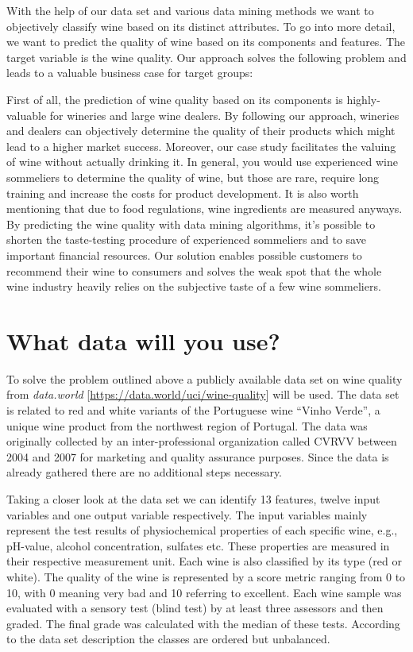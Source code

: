 \documentclass[11pt,titlepage,oneside,openany]{article}
\begin{document}
With the help of our data set and various data mining methods we want to objectively classify wine based on its distinct attributes. To go into more detail, we want to predict the quality of wine based on its components and features. The target variable is the wine quality. Our approach solves the following problem and leads to a valuable business case for target groups:

First of all, the prediction of wine quality based on its components is highly-valuable for wineries and large wine dealers. By following our approach, wineries and dealers can objectively determine the quality of their products which might lead to a higher market success. Moreover, our case study facilitates the valuing of wine without actually drinking it. In general, you would use experienced wine sommeliers to determine the quality of wine, but those are rare, require long training and increase the costs for product development. It is also worth mentioning that due to food regulations, wine ingredients are measured anyways. By predicting the wine quality with data mining algorithms, it’s possible to shorten the taste-testing procedure of experienced sommeliers and to save important financial resources. Our solution enables possible customers to recommend their wine to consumers and solves the weak spot that the whole wine industry heavily relies on the subjective taste of a few wine sommeliers.

\section{What data will you use?}
To solve the problem outlined above a publicly available data set on wine quality from \textit{data.world} [\url{https://data.world/uci/wine-quality}] will be used. The data set is related to red and white variants of the Portuguese wine “Vinho Verde”, a unique wine product from the northwest region of Portugal. The data was originally collected by an inter-professional organization called CVRVV between 2004 and 2007 for marketing and quality assurance purposes. Since the data is already gathered there are no additional steps necessary. 

Taking a closer look at the data set we can identify 13 features, twelve input variables and one output variable respectively. The input variables mainly represent the test results of physiochemical properties of each specific wine, e.g., pH-value, alcohol concentration, sulfates etc. These properties are measured in their respective measurement unit. Each wine is also classified by its type (red or white). The quality of the wine is represented by a score metric ranging from 0 to 10, with 0 meaning very bad and 10 referring to excellent. Each wine sample was evaluated with a sensory test (blind test) by at least three assessors and then graded. The final grade was calculated with the median of these tests. According to the data set description the classes are ordered but unbalanced.
\end{document}

